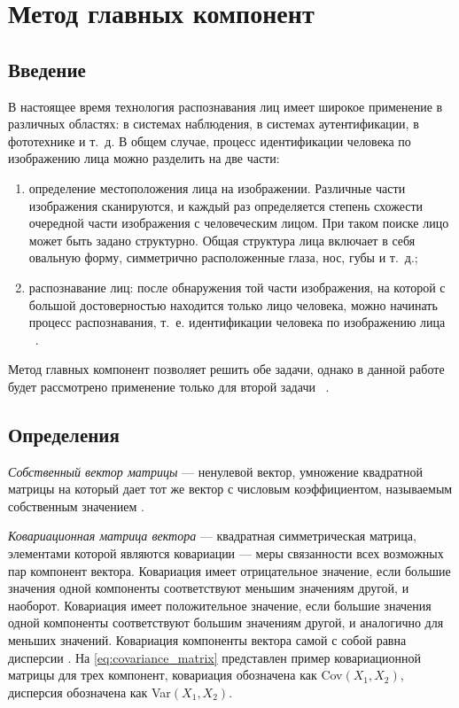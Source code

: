\chapter{Метод главных компонент}
\section{Введение}

В настоящее время технология распознавания лиц имеет широкое применение в различных областях: в системах наблюдения, в системах аутентификации, в фототехнике и т.~д. В общем случае, процесс идентификации человека по изображению лица можно разделить на две части:
\begin{enumerate}
	\item определение местоположения лица на изображении. Различные части изображения сканируются, и каждый раз определяется степень схожести очередной части изображения с человеческим лицом.  При таком поиске лицо может быть задано структурно. Общая структура лица включает в себя овальную форму, симметрично расположенные глаза, нос, губы и т.~д.;
	\item распознавание лиц: после обнаружения той части изображения, на которой с большой достоверностью находится только лицо человека, можно начинать процесс распознавания, т.~е. идентификации человека по изображению лица ~\cite{ieee}.
\end{enumerate}

Метод главных компонент позволяет решить обе задачи, однако в данной работе  будет рассмотрено применение только для второй задачи ~\cite{brilyuk}.

\section{Определения}

\textit{Собственный вектор матрицы} --- ненулевой вектор, умножение квадратной матрицы на который дает тот же вектор с числовым коэффициентом, называемым собственным значением \cite{linal}.

\textit{Ковариационная матрица вектора} --- квадратная симметрическая матрица, элементами которой являются ковариации --- меры связанности всех возможных пар компонент вектора. Ковариация имеет отрицательное значение, если большие значения одной компоненты соответствуют меньшим значениям другой, и наоборот. Ковариация имеет положительное значение, если большие значения одной компоненты соответствуют большим значениям другой, и аналогично для меньших значений. Ковариация компоненты вектора самой с собой равна дисперсии \cite{teorver}. На \eqref{eq:covariance_matrix} представлен пример ковариационной матрицы для трех компонент, ковариация обозначена как Cov$(X_1, X_2)$, дисперсия обозначена как Var$(X_1, X_2)$.

